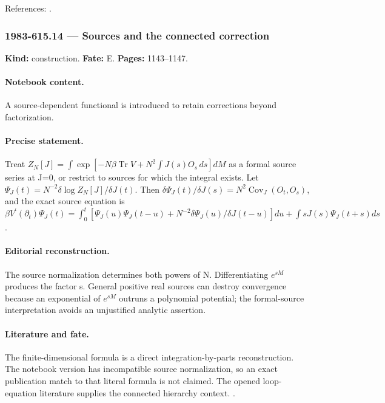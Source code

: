 \noindent References: \citep{brezinitzyksonparisizuber1978planar}.\par

\subsubsection{1983-615.14 --- Sources and the connected correction}

\label{item:1983-615.14}

\noindent\textbf{Kind:} construction. \textbf{Fate:} E. \textbf{Pages:} 1143--1147.\par

\paragraph{Notebook content.} A source-dependent functional is introduced to retain corrections beyond factorization.

\paragraph{Precise statement.} Treat $Z_N[J]=\int\exp[-N\beta\operatorname{Tr}V+N^2\int J(s)O_s\,ds]dM$ as a formal source series at J=0, or restrict to sources for which the integral exists. Let $\Psi_J(t)=N^{-2}\delta\log Z_N[J]/\delta J(t)$. Then $\delta\Psi_J(t)/\delta J(s)=N^2\operatorname{Cov}_J(O_t,O_s)$, and the exact source equation is $\beta V^{\prime}(\partial_t)\Psi_J(t)=\int_0^t[\Psi_J(u)\Psi_J(t-u)+N^{-2}\delta\Psi_J(u)/\delta J(t-u)]du+\int sJ(s)\Psi_J(t+s)ds$.

\paragraph{Editorial reconstruction.} The source normalization determines both powers of N. Differentiating $e^{sM}$ produces the factor s. General positive real sources can destroy convergence because an exponential of $e^{sM}$ outruns a polynomial potential; the formal-source interpretation avoids an unjustified analytic assertion.

\paragraph{Literature and fate.} The finite-dimensional formula is a direct integration-by-parts reconstruction. The notebook version has incompatible source normalization, so an exact publication match to that literal formula is not claimed. The opened loop-equation literature supplies the connected hierarchy context. \citep{makeenko2000large,brezinitzyksonparisizuber1978planar}.

